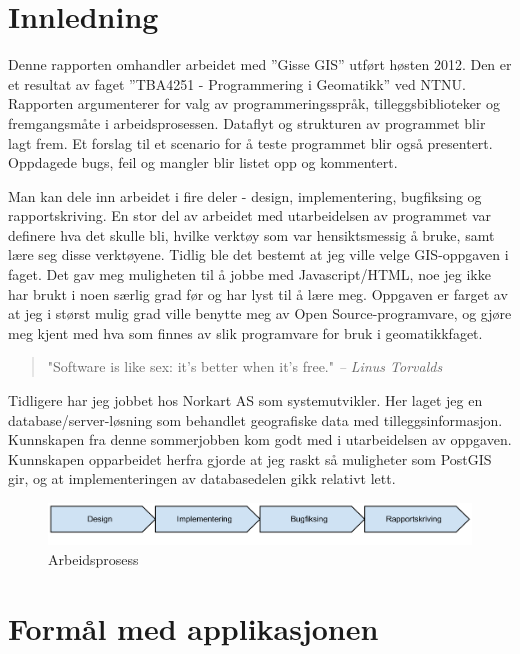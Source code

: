 \documentclass[12pt,twoside,onecolumn]{article}
\begin{document}
\tableofcontents
\newpage

\section{Innledning}
	
	Denne rapporten omhandler arbeidet med ''Gisse GIS'' utført høsten 2012. Den er et resultat av faget ''TBA4251 - Programmering i Geomatikk'' ved NTNU. Rapporten argumenterer for valg av programmeringsspråk, tilleggsbiblioteker og fremgangsmåte i arbeidsprosessen. Dataflyt og strukturen av programmet blir lagt frem. Et forslag til et scenario for å teste programmet blir også presentert. Oppdagede bugs, feil og mangler blir listet opp og kommentert. 
	
	Man kan dele inn arbeidet i fire deler - design, implementering, bugfiksing og rapportskriving. En stor del av arbeidet med utarbeidelsen av programmet var definere hva det skulle bli, hvilke verktøy som var hensiktsmessig å bruke, samt lære seg disse verktøyene. Tidlig ble det bestemt at jeg ville velge GIS-oppgaven i faget. Det gav meg muligheten til å jobbe med Javascript/HTML, noe jeg ikke har brukt i noen særlig grad før og har lyst til å lære meg. Oppgaven er farget av at jeg i størst mulig grad ville benytte meg av Open Source-programvare, og gjøre meg kjent med hva som finnes av slik programvare for bruk i geomatikkfaget. 
	
	\begin{quotation}
		"Software is like sex: it's better when it's free." 
			\em  -- Linus Torvalds
	\end{quotation}
	
	Tidligere har jeg jobbet hos Norkart AS som systemutvikler. Her laget jeg en database/server-løsning som behandlet geografiske data med tilleggsinformasjon. Kunnskapen fra denne sommerjobben kom godt med i utarbeidelsen av oppgaven. Kunnskapen opparbeidet herfra gjorde at jeg raskt så muligheter som PostGIS gir, og at implementeringen av databasedelen gikk relativt lett.
	
	\begin{figure}[h]
	\centering
	\includegraphics[scale=0.5]{innledning.png}
	\caption[Arbeidsprosess]{Arbeidsprosess}
	\end{figure}
	
\section{Formål med applikasjonen}
\end{document}
